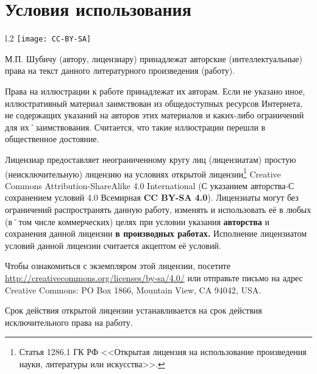﻿%
\chapter{Условия использования}

\begin{wrapfigure}{l}{.2\textwidth}
\centering
\texttt{[image: CC-BY-SA]}
\label{fig:CC-BY-SA}
\end{wrapfigure}

\noindent М.П. Шубичу (автору, лицензиару) принадлежат авторские (интеллектуальные) права на текст данного литературного произведения (работу). 

\noindent Права на иллюстрации к работе принадлежат их авторам. Если не указано иное, иллюстративный материал заимствован из общедоступных ресурсов Интернета, не содержащих указаний на авторов этих материалов и каких-либо ограничений для их˚заимствования. Считается, что такие иллюстрации перешли в общественное достояние.

Лицензиар предоставляет неограниченному кругу лиц (лицензиатам) простую (неисключительную) лицензию на условиях открытой лицензии\footnote
{Статья 1286.1 ГК РФ <<Открытая лицензия на использование произведения науки, литературы или искусства>>.}
Creative Commons Attribution-ShareAlike 4.0 International (С указанием авторства-С сохранением условий 4.0 Всемирная \textbf{CC BY-SA 4.0}). Лицензиаты могут без ограничений распространять данную работу, изменять и использовать её в любых (в˚том числе коммерческих) целях при условии указания \textbf{авторства} и сохранения данной лицензии \textbf{в производных работах.}
Исполнение лицензиатом условий данной лицензии считается акцептом её условий.

Чтобы ознакомиться с экземпляром этой лицензии, посетите \url{http://creativecommons.org/licenses/by-sa/4.0/} или отправьте письмо на адрес Creative Commons: PO Box 1866, Mountain View, CA 94042, USA.{\sloppy

}%

Срок действия открытой лицензии устанавливается на срок действия исключительного права на работу.